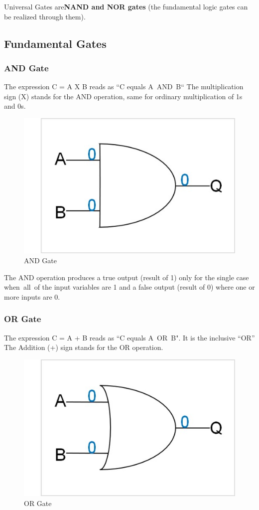\documentclass{article}
\begin{document}
			Universal Gates are\textbf{NAND and NOR gates} (the fundamental logic gates can be realized through them).
			
			\subsection{Fundamental Gates}
				\subsubsection{AND Gate}
					The expression C = A X B reads as “C equals A AND B“ 
					The multiplication sign (X) stands for the AND operation, same for ordinary multiplication of 1s and 0s.\newline
						\begin{figure}[h!]
							\begin{center}
								\caption{AND Gate}
								\label{fig 1: AND gate}
								\includegraphics[width=0.5\linewidth]{pictures/AND Gate.jpg}
							\end{center}
						\end{figure}
					
					The AND operation produces a true output (result of 1) only for the single case when all of the input variables are 1 and a false output (result of 0) where one or more inputs are 0.
					
				\subsubsection{OR Gate}
					The expression C = A + B reads as “C equals A OR B". It is the inclusive “OR”
					The Addition (+) sign stands for the OR operation. \newline
						\begin{figure}[h!]
							\caption{OR Gate}
							\label{fig 2: OR Gate}
							\begin{center}
								\includegraphics[width=0.5\linewidth]{pictures/OR Gate.jpg}
							\end{center}
						\end{figure}
						
\end{document}

